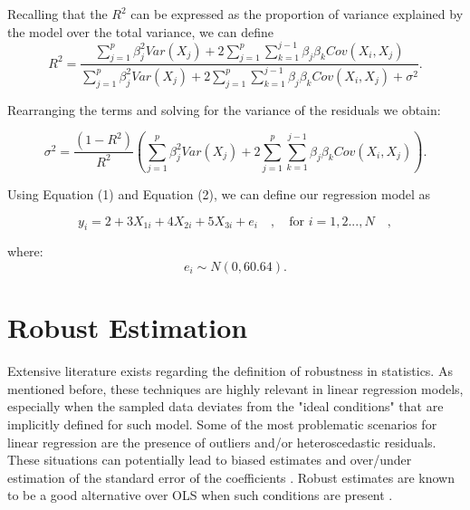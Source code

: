 \documentclass[a4paper]{article}
\begin{document}
\noindent
Recalling that the $R^2$ can be expressed as the proportion of variance explained by the model over the total variance, we can define
\begin{equation*}
R^2=\frac{\sum_{j=1}^p\beta_{j}^2Var(X_{j})+2\sum_{j=1}^p\sum_{k=1}^{j-1}\beta_{j}\beta_{k}Cov(X_{i},X_{j})}{\sum_{j=1}^p\beta_{j}^2Var(X_{j})+2\sum_{j=1}^p\sum_{k=1}^{j-1}\beta_{j}\beta_{k}Cov(X_{i},X_{j})+\sigma^2}.
\end{equation*}

\vspace{3mm}
\noindent
Rearranging the terms and solving for the variance of the residuals we obtain:

\begin{equation}
\sigma^2=\frac{(1-R^2)}{R^2}\left(\sum_{j=1}^p\beta_{j}^2Var(X_{j})+2\sum_{j=1}^p\sum_{k=1}^{j-1}\beta_{j}\beta_{k}Cov(X_{i},X_{j})\right).
\end{equation}

\vspace{3mm}
\noindent
Using Equation (1) and Equation (2), we can define our regression model as

\begin{equation*}
y_i=2+3X_{1i}+4X_{2i}+5X_{3i}+e_i \quad , \quad \text{for } i=1,2...,N \quad ,
\end{equation*}

\noindent
where:
\begin{equation*}
e_i\sim{}N(0,60.64).
\end{equation*}

\section{Robust Estimation} \label{robustestimation}
Extensive literature exists regarding the definition of robustness in statistics. As mentioned before, these techniques are highly relevant in linear regression models, especially when the sampled data deviates from the "ideal conditions" that are implicitly defined for such model. Some of the most problematic scenarios for linear regression are the presence of outliers and/or heteroscedastic residuals. These situations can potentially lead to biased estimates and over/under estimation of the standard error of the coefficients \citep{wilcox2016}. Robust estimates are known to be a good alternative over OLS when such conditions are present \citep{wilcox2016}.
\end{document}
